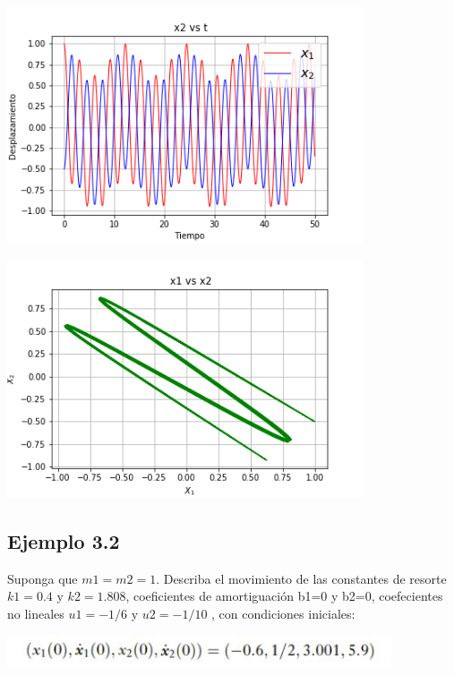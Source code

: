 \documentclass{article}
\begin{document}
\begin{center}
\includegraphics[height=7cm]{nolineal3_1_5.png}
\end{center}

\begin{center}
\includegraphics[height=7cm]{nolineal3_1_6.png}
\end{center}

\subsection{Ejemplo 3.2}

Suponga que $m1=m2=1$. Describa el movimiento de las constantes de resorte $k1=0.4$ y $k2=1.808$, coeficientes de amortiguación b1=0 y b2=0, coefecientes no lineales $u1=-1/6$ y $u2=-1/10$ , con condiciones iniciales:



\begin{center}
\includegraphics[height=1cm]{ec16.png}
\end{center}
\end{document}
